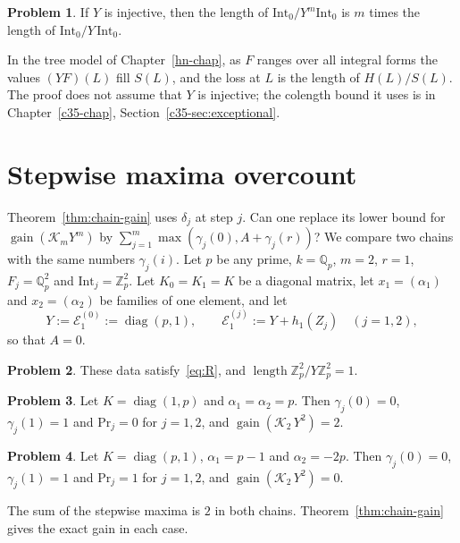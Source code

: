 \documentclass[reqno]{amsart}
\newcounter{chap}
\theoremstyle{definition}
\newtheorem{problem}{Problem}[section]
\theoremstyle{plain}
\theoremstyle{remark}
\newcommand{\Z}{\mathbb{Z}}
\newcommand{\Q}{\mathbb{Q}}
\newcommand{\Ec}{\mathcal{E}}
\newcommand{\Kc}{\mathcal{K}}
\newcommand{\Int}{\mathrm{Int}}
\newcommand{\Price}{\mathrm{Pr}}
\newcommand{\len}{\operatorname{length}}
\newcommand{\gain}{\operatorname{gain}}
\newcommand{\diag}{\operatorname{diag}}
\begin{document}
\begin{problem}\label{pr:colength}
If \(Y\) is injective, then the length of \(\Int_0/Y^m\Int_0\) is \(m\) times the length of \(\Int_0/Y\,\Int_0\).
\end{problem}

In the tree model of Chapter~\ref{hn-chap}, as \(F\) ranges over all integral forms the values \((YF)(L)\) fill \(S(L)\), and the loss at \(L\) is the length of \(H(L)/S(L)\).  The proof does not assume that \(Y\) is injective; the colength bound it uses is in Chapter~\ref{c35-chap}, Section~\ref{c35-sec:exceptional}.

\section{Stepwise maxima overcount}\label{sec:overcount}

Theorem~\ref{thm:chain-gain} uses \(\delta_j\) at step \(j\).  Can one replace its lower bound for \(\gain(\Kc_m Y^m)\) by \(\sum_{j=1}^m \max(\gamma_j(0), A + \gamma_j(r))\)?  We compare two chains with the same numbers \(\gamma_j(i)\).  Let \(p\) be any prime, \(k = \Q_p\), \(m = 2\), \(r = 1\), \(F_j = \Q_p^2\) and \(\Int_j = \Z_p^2\).  Let \(K_0 = K_1 = K\) be a diagonal matrix, let \(x_1 = (\alpha_1)\) and \(x_2 = (\alpha_2)\) be families of one element, and let
\[
  Y := \Ec^{(0)}_1 := \diag(p, 1) , \qquad \Ec^{(j)}_1 := Y + h_1(Z_j) \quad (j = 1, 2) ,
\]
so that \(A = 0\).

\begin{problem}\label{pr:diag}
These data satisfy~\eqref{eq:R}, and \(\len \Z_p^2/Y\Z_p^2 = 1\).
\end{problem}

\begin{problem}\label{pr:good}
Let \(K = \diag(1, p)\) and \(\alpha_1 = \alpha_2 = p\).  Then \(\gamma_j(0) = 0\), \(\gamma_j(1) = 1\) and \(\Price_j = 0\) for \(j = 1, 2\), and \(\gain(\Kc_2\, Y^2) = 2\).
\end{problem}

\begin{problem}\label{pr:bad}
Let \(K = \diag(p, 1)\), \(\alpha_1 = p - 1\) and \(\alpha_2 = -2p\).  Then \(\gamma_j(0) = 0\), \(\gamma_j(1) = 1\) and \(\Price_j = 1\) for \(j = 1, 2\), and \(\gain(\Kc_2\, Y^2) = 0\).
\end{problem}

The sum of the stepwise maxima is \(2\) in both chains.  Theorem~\ref{thm:chain-gain} gives the exact gain in each case.
\end{document}
